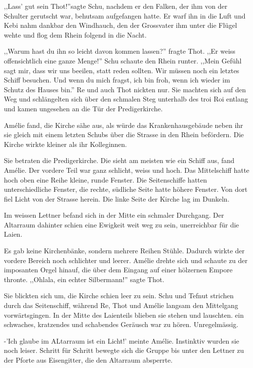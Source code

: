 \documentclass[11pt,titlepage,a5paper]{book}
\begin{document}
,,Lass' gut sein Thot!''sagte Schu, nachdem er den Falken, der ihm von der Schulter gerutscht war, behutsam aufgefangen hatte. Er warf ihn in die Luft und Kebi nahm dankbar den Windhauch, den der Grossvater ihm unter die Flügel wehte und flog dem Rhein folgend in die Nacht.

,,Warum hast du ihn so leicht davon kommen lassen?'' fragte Thot. ,,Er weiss offensichtlich eine ganze Menge!'' Schu schaute den Rhein runter. ,,Mein Gefühl sagt mir, dass wir uns beeilen, statt reden sollten. Wir müssen noch ein letztes Schiff besuchen. Und wenn du mich fragst, ich bin froh, wenn ich wieder im Schutz des Hauses bin.'' Re und auch Thot nickten nur. Sie machten sich auf den Weg und schlängelten sich über den schmalen Steg unterhalb des troi Roi entlang und kamen ungesehen an die Tür der Predigerkirche.

Amélie fand, die Kirche sähe aus, als würde das Krankenhausgebäude neben ihr sie gleich mit einem letzten Schubs über die Strasse in den Rhein befördern. Die Kirche wirkte kleiner als ihr Kolleginnen.

Sie betraten die Predigerkirche. Die sieht am meisten wie ein Schiff aus, fand Amélie. Der vordere Teil war ganz schlicht, weiss und hoch. Das Mittelschiff hatte hoch oben eine Reihe kleine, runde Fenster. Die Seitenschiffe hatten unterschiedliche Fenster, die rechte, südliche Seite hatte höhere Fenster. Von dort fiel Licht von der Strasse herein. Die linke Seite der Kirche lag im Dunkeln.

Im weissen Lettner befand sich in der Mitte ein schmaler Durchgang. Der Altarraum dahinter schien eine Ewigkeit weit weg zu sein, unerreichbar für die Laien.

Es gab keine Kirchenbänke, sondern mehrere Reihen Stühle. Dadurch wirkte der vordere Bereich noch schlichter und leerer. Amélie drehte sich und schaute zu der imposanten Orgel hinauf, die über dem Eingang auf einer hölzernen Empore thronte. ,,Ohlala, ein echter Silbermann!'' sagte Thot. 

Sie blickten sich um, die Kirche schien leer zu sein. Schu und Tefnut strichen durch das Seitenschiff, während Re, Thot und Amélie langsam den Mittelgang vorwärtsgingen. In der Mitte des Laienteils blieben sie stehen und lauschten. ein schwaches, kratzendes und schabendes Geräusch war zu hören. Unregelmässig.  

-'Ich glaube im ALtarraum ist ein Licht!' meinte Amélie. Instinktiv wurden sie noch leiser. Schritt für Schritt bewegte sich die Gruppe bis unter den Lettner zu der Pforte aus Eisengitter, die den Altarraum absperrte.
\end{document}
